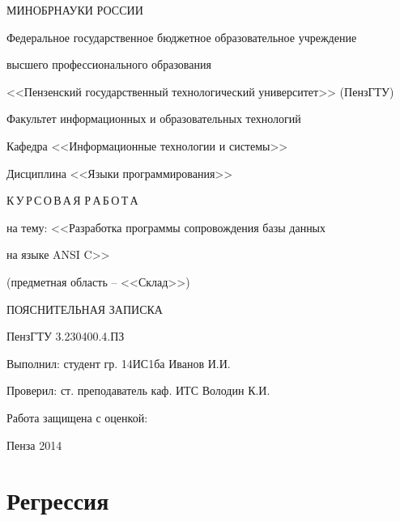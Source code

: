 \documentclass[a4paper,14pt]{article}
\begin{document}
\newpage

\thispagestyle{empty}
\begin{center}
МИНОБРНАУКИ РОССИИ

Федеральное государственное бюджетное образовательное учреждение 

высшего профессионального образования

<<Пензенский государственный технологический университет>>
(ПензГТУ)

\vspace{36pt}

Факультет информационных и образовательных технологий

Кафедра <<Информационные технологии и системы>>

Дисциплина <<Языки программирования>>

\vspace{36pt}

К\,У\,Р\,С\,О\,В\,А\,Я Р\,А\,Б\,О\,Т\,А

на тему: <<Разработка программы сопровождения базы данных 

на языке ANSI C>>

(предметная область – <<Склад>>)

\vspace{72pt}

ПОЯСНИТЕЛЬНАЯ ЗАПИСКА

ПензГТУ 3.230400.4.ПЗ

\vspace{72pt}

\parbox{12cm}{
Выполнил: студент гр. 14ИС1ба Иванов И.И.

Проверил: ст. преподаватель каф. ИТС Володин К.И.

Работа защищена с оценкой: \hrulefill
}

\vfill

Пенза 2014
\end{center}

\newpage

\section{Регрессия}
\end{document}
